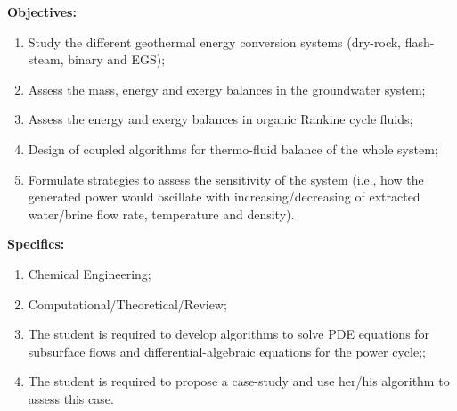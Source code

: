 \documentclass[12pts,a4paper,amsmath,amssymb,floatfix]{article}%
\begin{document}
\begin{enumerate}[label=\bfseries Project \arabic*:]
\noindent
{\bf Objectives:}
\begin{enumerate}
\item Study the different geothermal energy conversion systems (dry-rock, flash-steam, binary and EGS);
\item Assess the mass, energy and exergy balances in the groundwater system;
\item Assess the energy and exergy balances in organic Rankine cycle fluids;
\item Design of coupled algorithms for thermo-fluid balance of the whole system;
\item Formulate strategies to assess the sensitivity of the system (i.e., how the generated power would oscillate with increasing/decreasing of extracted water/brine flow rate, temperature and density). 
\end{enumerate}

\noindent
{\bf Specifics:} 
\begin{enumerate}
\item Chemical Engineering;
\item Computational/Theoretical/Review;
\item The student is required to develop algorithms to solve PDE equations for subsurface flows and differential-algebraic equations for the power cycle;;
\item The student is required to propose a case-study and use her/his algorithm to assess this case.
\end{enumerate}


\end{enumerate}
\end{document}
